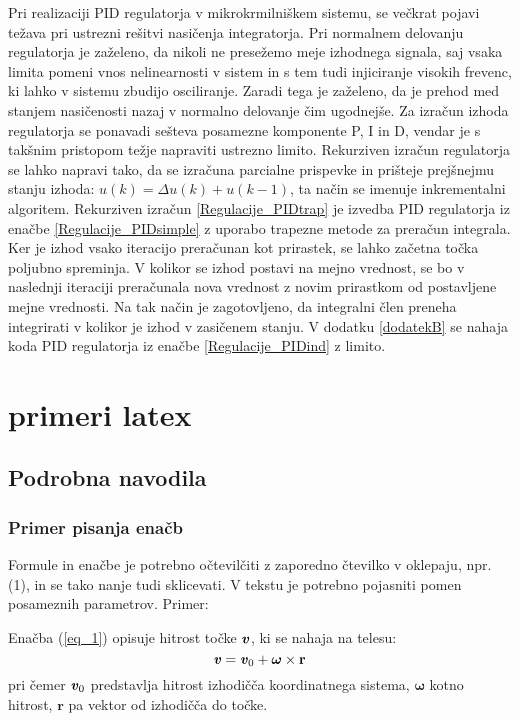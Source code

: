 \documentclass[a4paper,twoside,openright,12pt]{book}
\begin{document}
{	Pri realizaciji PID regulatorja v mikrokrmilniškem sistemu, se večkrat pojavi težava pri ustrezni rešitvi nasičenja integratorja. Pri normalnem delovanju regulatorja je zaželeno, da nikoli ne presežemo meje izhodnega signala, saj vsaka limita pomeni vnos nelinearnosti v sistem in s tem tudi injiciranje visokih frevenc, ki lahko v sistemu zbudijo osciliranje. Zaradi tega je zaželeno, da je prehod med stanjem nasičenosti nazaj v normalno delovanje čim ugodnejše. Za izračun izhoda regulatorja se ponavadi sešteva posamezne komponente P, I in D, vendar je s takšnim pristopom težje napraviti ustrezno limito. Rekurziven izračun regulatorja se lahko napravi tako, da se izračuna parcialne prispevke in prišteje prejšnejmu stanju izhoda: $u(k)= \Delta u(k) + u(k-1)$, ta način se imenuje inkrementalni algoritem. Rekurziven izračun \ref{Regulacije_PIDtrap} je izvedba PID regulatorja iz enačbe \ref{Regulacije_PIDsimple} z uporabo trapezne metode za preračun integrala. Ker je izhod vsako iteracijo preračunan kot prirastek, se lahko začetna točka poljubno spreminja. V kolikor se izhod postavi na mejno vrednost, se bo v naslednji iteraciji preračunala nova vrednost z novim prirastkom od postavljene mejne vrednosti. Na tak način je zagotovljeno, da integralni člen preneha integrirati v kolikor je izhod v zasičenem stanju. V dodatku \ref{dodatekB} se nahaja koda PID regulatorja iz enačbe \ref{Regulacije_PIDind} z limito.  


\chapter{primeri latex}
\section{Podrobna navodila} \label{podrobna_navodila}
\subsection{Primer pisanja enačb} \label{vnos_enacb}

Formule in enačbe je potrebno očtevilčiti z zaporedno čtevilko v
oklepaju, npr. (1), in se tako nanje tudi sklicevati. V tekstu je
potrebno pojasniti pomen posameznih parametrov. Primer:

Enačba (\ref{eq_1}) opisuje hitrost točke $\textbf{\textit{v}}$, ki se nahaja
na telesu:
\begin{equation}\label{eq_1}
    \textbf{\textit{v}} = \textbf{\textit{v}}_0 + \boldsymbol{\omega} \times \mathbf{r}
\end{equation}
pri čemer $\textbf{\textit{v}}_0$ predstavlja hitrost izhodičča koordinatnega
sistema, $\boldsymbol{\omega}$ kotno hitrost, $\mathbf{r}$ pa vektor
od izhodičča do točke.

}
\end{document}
